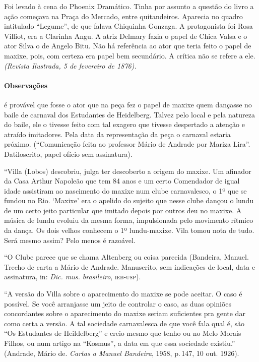 Foi levado à cena do Phoenix Dramático. Tinha por assunto a questão do
livro a ação começava na Praça do Mercado, entre quitandeiros. Aparecia
no quadro intitulado ``Legume'', de que falava Chiquinha Gonzaga. A
protagonista foi Rosa Villiot, era a Clarinha Angu. A atriz Delmary
fazia o papel de Chica Valsa e o ator Silva o de Angelo Bitu. Não há
referência ao ator que teria feito o papel de maxixe, pois, com certeza
era papel bem secundário. A crítica não se refere a ele. \emph{(Revista
Ilustrada, 5 de fevereiro de 1876).}

\paragraph{Observações} é provável que fosse o ator que na peça fez o papel de
maxixe quem dançasse no baile de carnaval dos Estudantes de Heidelberg.
Talvez pelo local e pela natureza do baile, ele o tivesse feito com tal
exagero que tivesse despertado a atenção e atraído imitadores. Pela data
da representação da peça o carnaval estaria próximo. (``Comunicação
feita ao professor Mário de Andrade por Mariza Lira''. Datiloscrito,
papel ofício sem assinatura).

``Villa (Lobos) descobriu, julga ter descoberto a origem do maxixe. Um
afinador da Casa Arthur Napoleão que tem 84 anos e um certo Comendador
de igual idade assistiram ao nascimento do maxixe num clube
carnavalesco, o 1º que se fundou no Rio. `Maxixe' era o apelido do
sujeito que nesse clube dançou o lundu de um certo jeito particular que
imitado depois por outros deu no maxixe. A música de lundu evoluiu da
mesma forma, impulsionada pelo movimento rítmico da dança. Os dois
velhos conhecem o 1º lundu-maxixe. Vila tomou nota de tudo. Será mesmo
assim? Pelo menos é razoável.

``O Clube parece que se chama Altenberg ou coisa parecida (Bandeira,
Manuel. Trecho de carta a Mário de Andrade. Manuscrito, sem indicações
de local, data e assinatura, in: \textit{Dic. mus. brasileiro}, \textsc{ieb-usp}).

``A versão do Villa sobre o aparecimento do maxixe se pode aceitar. O
caso é possível. Se você arranjasse um jeito de controlar o caso, as
duas opiniões concordantes sobre o aparecimento do maxixe seriam
suficientes pra gente dar como certa a versão. A tal sociedade
carnavalesca de que você fala qual é, são ``Os Estudantes de Heildelberg''
e creio mesmo que tenho ou no Melo Morais Filhos, ou num artigo na
``Kosmus'', a data em que essa sociedade existiu.'' (Andrade, Mário de.
\emph{Cartas a Manuel Bandeira}, 1958, p.\,147, 10 out. 1926).

